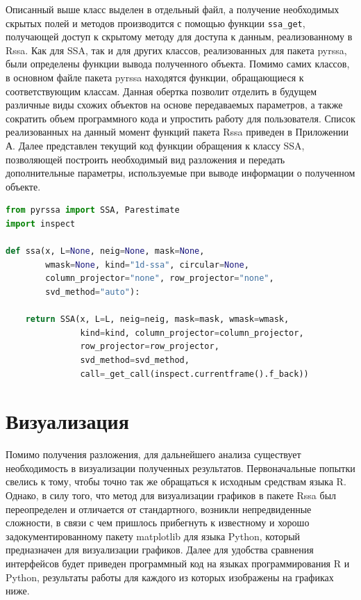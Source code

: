 \documentclass[specialist,
			   substylefile = spbu_report.rtx,
			   subf,href,colorlinks=true, 12pt]{disser}
\begin{document}
Описанный выше класс выделен в отдельный файл, а получение необходимых скрытых полей и методов производится с помощью функции \verb|ssa_get|, получающей доступ к скрытому методу для доступа к данным, реализованному в Rssa. Как для SSA, так и для других классов, реализованных для пакета pyrssa, были определены функции вывода полученного объекта. Помимо самих классов, в основном файле пакета pyrssa находятся функции, обращающиеся к соответствующим классам. Данная обертка позволит отделить в будущем различные виды схожих объектов на основе передаваемых параметров, а также сократить объем программного кода и упростить работу для пользователя. Список реализованных на данный момент функций пакета Rssa приведен в Приложении А. Далее представлен текущий код функции обращения к классу SSA, позволяющей построить необходимый вид разложения и передать дополнительные параметры, используемые при выводе информации о полученном объекте.

\begin{lstlisting}[language=Python, caption=Реализация функции для обращения к типу данных SSA в Python.]
from pyrssa import SSA, Parestimate
import inspect

def ssa(x, L=None, neig=None, mask=None,
        wmask=None, kind="1d-ssa", circular=None,
        column_projector="none", row_projector="none",
        svd_method="auto"):
	
	return SSA(x, L=L, neig=neig, mask=mask, wmask=wmask,
	           kind=kind, column_projector=column_projector,
	           row_projector=row_projector,
	           svd_method=svd_method,
	           call=_get_call(inspect.currentframe().f_back))
\end{lstlisting}

\section{Визуализация}

Помимо получения разложения, для дальнейшего анализа существует необходимость в визуализации полученных результатов. Первоначальные попытки свелись к тому, чтобы точно так же обращаться к исходным средствам языка R. Однако, в силу того, что метод для визуализации графиков в пакете Rssa был переопределен и отличается от стандартного, возникли непредвиденные сложности, в связи с чем пришлось прибегнуть к известному и хорошо задокументированному пакету matplotlib \cite{matplotlib-doc} для языка Python, который предназначен для визуализации графиков. Далее для удобства сравнения интерфейсов будет приведен программный код на языках программирования R и Python, результаты работы для каждого из которых изображены на графиках ниже.
\end{document}
